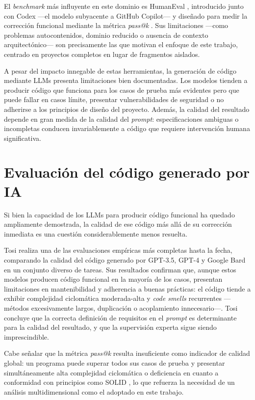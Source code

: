 El \textit{benchmark} más influyente en este dominio es HumanEval \cite{Chen:2021:Codex}, introducido junto con Codex ---el modelo subyacente a GitHub Copilot--- y diseñado para medir la corrección funcional mediante la métrica \textit{pass@k} \cite{Chen:2021:Codex}. Sus limitaciones ---como problemas autocontenidos, dominio reducido o ausencia de contexto arquitectónico--- son precisamente las que motivan el enfoque de este trabajo, centrado en proyectos completos en lugar de fragmentos aislados.

A pesar del impacto innegable de estas herramientas, la generación de código mediante \ac{LLMs} presenta limitaciones bien documentadas. Los modelos tienden a producir código que funciona para los casos de prueba más evidentes pero que puede fallar en casos límite, presentar vulnerabilidades de seguridad o no adherirse a los principios de diseño del proyecto. Además, la calidad del resultado depende en gran medida de la calidad del \textit{prompt}: especificaciones ambiguas o incompletas conducen invariablemente a código que requiere intervención humana significativa.

\section{Evaluación del código generado por IA} \label{sec:evaluacion-calidad}

Si bien la capacidad de los \ac{LLMs} para producir código funcional ha quedado ampliamente demostrada, la calidad de ese código más allá de su corrección inmediata es una cuestión considerablemente menos resuelta. 

Tosi \cite{Tosi:2024:CodeQuality} realiza una de las evaluaciones empíricas más completas hasta la fecha, comparando la calidad del código generado por GPT-3.5, GPT-4 y Google Bard en un conjunto diverso de tareas. Sus resultados confirman que, aunque estos modelos producen código funcional en la mayoría de los casos, presentan limitaciones en mantenibilidad y adherencia a buenas prácticas: el código tiende a exhibir complejidad ciclomática moderada-alta y \textit{code smells} \cite{Fowler:1999:Refactoring} recurrentes ---métodos excesivamente largos, duplicación o acoplamiento innecesario---. Tosi concluye que la correcta definición de requisitos en el \textit{prompt} es determinante para la calidad del resultado, y que la supervisión experta sigue siendo imprescindible.

Cabe señalar que la métrica \textit{pass@k} \cite{Chen:2021:Codex} resulta insuficiente como indicador de calidad global: un programa puede superar todos sus casos de prueba y presentar simultáneamente alta complejidad ciclomática o deficiencia en cuanto a conformidad con principios como \ac{SOLID} \cite{Martin:2003:Agile}, lo que refuerza la necesidad de un análisis multidimensional como el adoptado en este trabajo.

